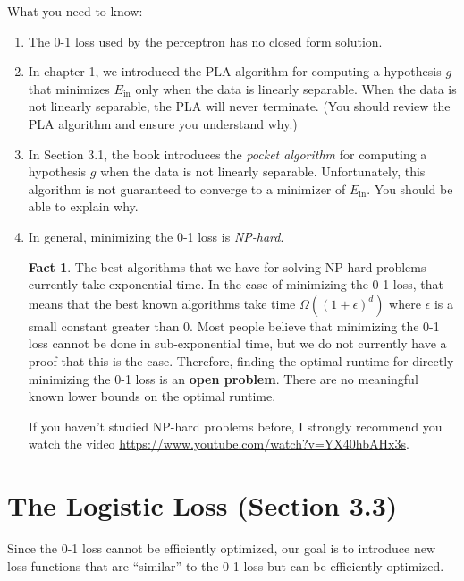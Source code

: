 \documentclass[10pt]{exam}
\theoremstyle{definition}
\newtheorem{example}{Example}
\newtheorem{fact}{Fact}
\newcommand{\Ein}{E_{\text{in}}}
\begin{document}
What you need to know:
\begin{enumerate}
    \item
    The 0-1 loss used by the perceptron has no closed form solution.
    \item
    In chapter 1, we introduced the PLA algorithm for computing a hypothesis $g$ that minimizes $\Ein$ only when the data is linearly separable.
    When the data is not linearly separable, the PLA will never terminate.
    (You should review the PLA algorithm and ensure you understand why.)

    \item
    In Section 3.1, the book introduces the \emph{pocket algorithm} for computing a hypothesis $g$ when the data is not linearly separable.
    Unfortunately, this algorithm is not guaranteed to converge to a minimizer of $\Ein$.
    You should be able to explain why.

    \item
    In general, minimizing the 0-1 loss is \emph{NP-hard}.

\begin{fact}
    The best algorithms that we have for solving NP-hard problems currently take exponential time.
    In the case of minimizing the 0-1 loss, that means that the best known algorithms take time $\Omega((1+\epsilon)^d)$ where $\epsilon$ is a small constant greater than 0. 
    Most people believe that minimizing the 0-1 loss cannot be done in sub-exponential time,
    but we do not currently have a proof that this is the case.
    Therefore, finding the optimal runtime for directly minimizing the 0-1 loss is an \textbf{open problem}.
    There are no meaningful known lower bounds on the optimal runtime.

    If you haven't studied NP-hard problems before, I strongly recommend you watch the video \url{https://www.youtube.com/watch?v=YX40hbAHx3s}.
\end{fact}

\end{enumerate}

\newpage
\section*{The Logistic Loss (Section 3.3)}

Since the 0-1 loss cannot be efficiently optimized, our goal is to introduce new loss functions that are ``similar'' to the 0-1 loss but can be efficiently optimized.
\end{document}

